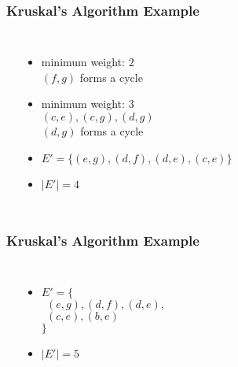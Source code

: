\documentclass[dvipsnames]{beamer}
\begin{document}
\begin{frame}
  \frametitle{Kruskal's Algorithm Example}

  \begin{columns}
    \begin{center}
    \end{center}

    \pause
    \begin{itemize}
      \item minimum weight: $2$\\
        $(f,g)$ forms a cycle

      \pause
      \item minimum weight: $3$\\
        $(c,e), (c,g), (d,g)$\\
        $(d,g)$ forms a cycle

      \pause
      \item $E' = \{ (e,g), (d,f), (d,e), (c,e) \}$
      \item $|E'| = 4$
    \end{itemize}
  \end{columns}
\end{frame}

\begin{frame}
  \frametitle{Kruskal's Algorithm Example}

  \begin{columns}
    \begin{center}
    \end{center}

    \pause
    \begin{itemize}
      \item $E' = \{$\\
        $~~(e,g), (d,f), (d,e),$\\
        $~~(c,e), (b,e)$\\
        $\}$
      \item $|E'| = 5$
    \end{itemize}
  \end{columns}
\end{frame}
\end{document}
